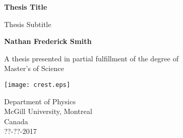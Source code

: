 \begin{titlepage}
    \begin{center}
        \vspace*{1cm}
        
        \Huge
        \textbf{
            Thesis Title
        }
        
        \vspace{0.5cm}
        \LARGE
        Thesis Subtitle
        
        \vspace{1.5cm}
        \Large 
        \textbf{Nathan Frederick Smith}
        
        \vfill

        \Large
        A thesis presented in partial fulfillment of the degree of\\
        Master's of Science
        
        \vspace{0.8cm}
        
        \texttt{[image: crest.eps]}
        
        \Large
        Department of Physics\\
        McGill University, Montreal\\
        Canada\\
        ??-??-2017
        
    \end{center}
\end{titlepage}

